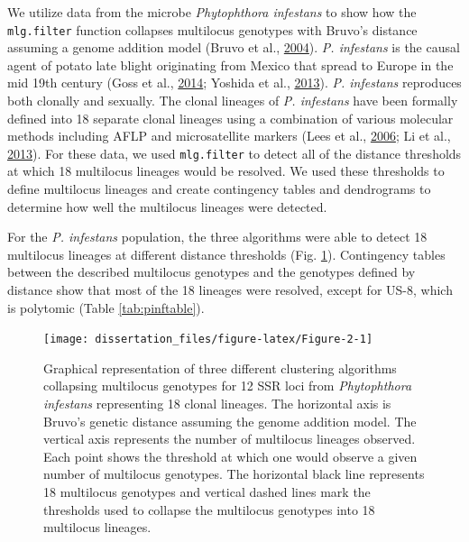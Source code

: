\documentclass[double,12pt]{beavtex}
\begin{document}
  We utilize data from the microbe \emph{Phytophthora infestans} to show
  how the \texttt{mlg.filter} function collapses multilocus genotypes with
  Bruvo's distance assuming a genome addition model (Bruvo et al.,
  \protect\hyperlink{ref-bruvo2004simple}{2004}). \emph{P. infestans} is
  the causal agent of potato late blight originating from Mexico that
  spread to Europe in the mid 19th century (Goss et al.,
  \protect\hyperlink{ref-goss2014irish}{2014}; Yoshida et al.,
  \protect\hyperlink{ref-yoshida2013rise}{2013}). \emph{P. infestans}
  reproduces both clonally and sexually. The clonal lineages of \emph{P.
  infestans} have been formally defined into 18 separate clonal lineages
  using a combination of various molecular methods including AFLP and
  microsatellite markers (Lees et al.,
  \protect\hyperlink{ref-lees2006novel}{2006}; Li et al.,
  \protect\hyperlink{ref-li2013efficient}{2013}). For these data, we used
  \texttt{mlg.filter} to detect all of the distance thresholds at which 18
  multilocus lineages would be resolved. We used these thresholds to
  define multilocus lineages and create contingency tables and dendrograms
  to determine how well the multilocus lineages were detected.
  
  For the \emph{P. infestans} population, the three algorithms were able
  to detect 18 multilocus lineages at different distance thresholds (Fig.
  \ref{fig:Figure-2}). Contingency tables between the described multilocus
  genotypes and the genotypes defined by distance show that most of the 18
  lineages were resolved, except for US-8, which is polytomic (Table
  \ref{tab:pinftable}).
  
  \begin{figure}
  
  {\centering \texttt{[image: dissertation\_files/figure-latex/Figure-2-1]} 
  
  }
  
  \caption[Graphical representation of three different clustering algorithms
  collapsing multilocus genotypes for 12 SSR loci from \emph{Phytophthora
  infestans} representing 18 clonal lineages.]{Graphical representation of three different clustering algorithms
  collapsing multilocus genotypes for 12 SSR loci from \emph{Phytophthora
  infestans} representing 18 clonal lineages. The horizontal axis is
  Bruvo's genetic distance assuming the genome addition model. The
  vertical axis represents the number of multilocus lineages observed.
  Each point shows the threshold at which one would observe a given number
  of multilocus genotypes. The horizontal black line represents 18
  multilocus genotypes and vertical dashed lines mark the thresholds used
  to collapse the multilocus genotypes into 18 multilocus lineages.}\label{fig:Figure-2}
  \end{figure}
  
\end{document}

